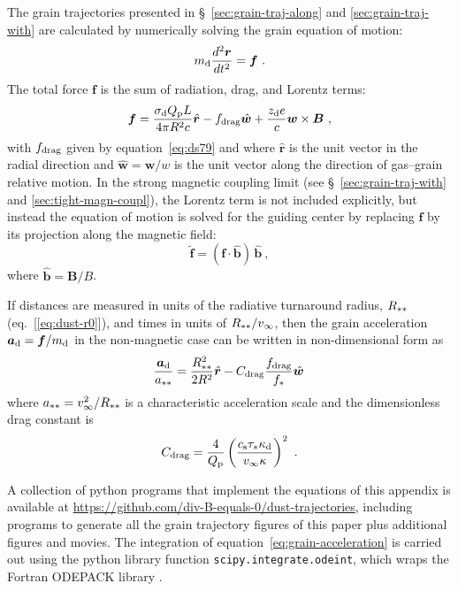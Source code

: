 The grain trajectories presented in \S~\ref{sec:grain-traj-along} and
\ref{sec:grain-traj-with} are calculated by numerically solving the
grain equation of motion:
\begin{equation}
  \label{eq:grain-equation-motion}
  m_{\text{d}} \frac{d^2 \bm{r}}{d t^2} = \bm{f} \ .
\end{equation}
The total force \(\bm{f}\) is the sum of radiation, drag, and Lorentz
terms:
\begin{equation}
  \label{eq:total-force}
  \bm{f} = \frac{\sigma_{\text{d}} Q_{\text{p}} L}{4\pi R^2 c} \hat{\bm{r}}
  - f_{\text{drag}} \hat{\bm{w}}
  + \frac{z_{\text{d}} e}{c} \bm{w} \times \bm{B} \ ,
\end{equation}
with \(f_{\text{drag}}\) given by equation~\eqref{eq:ds79} and where
\(\hat{\bm{r}}\) is the unit vector in the radial direction and
\(\hat{\bm{w}} = \bm{w} / w\) is the unit vector along the direction
of gas--grain relative motion.  In the strong magnetic coupling limit
(see \S~\ref{sec:grain-traj-with} and \ref{sec:tight-magn-coupl}), the
Lorentz term is not included explicitly, but instead the equation of
motion is solved for the guiding center by replacing \(\bm{f}\) by its
projection along the magnetic field: 
\begin{equation}
  \label{eq:projected-force}
  \widetilde{\bm{f}} = (\bm{f} \cdot \hat{\bm{b}})  \, \hat{\bm{b}} \ ,
\end{equation}
where \(\hat{\bm{b}} = \bm{B} / B\).

If distances are measured in units of the radiative turnaround radius,
\(R_{**}\) (eq.~[\ref{eq:dust-r0}]), and times in units of
\(R_{**} / v_\infty\), then the grain acceleration
\(\bm{a}_{\text{d}} = \bm{f} / m_{\text{d}}\) in the non-magnetic case can be
written in non-dimensional form as
\begin{equation}
  \label{eq:grain-acceleration}
  \frac{\bm{a}_{\text{d}}}{a_{**}}
  = \frac{R_{**}^2}{2 R^{2}} \hat{\bm{r}}
  - C_{\text{drag}} \frac{f_{\text{drag}}}{f_*} \hat{\bm{w}} \, 
\end{equation}
where \(a_{**} = v_\infty^2 / R_{**}\) is a characteristic
acceleration scale and the dimensionless drag constant is
\begin{equation}
  \label{eq:drag-constant}
  C_{\text{drag}} = \frac{4}{Q_{\text{p}}} \left(\frac{c_{\text{s}} \tau_* \kappa_{\text{d}}}{v_\infty \kappa}\right)^2 \ .
\end{equation}

A collection of python programs that implement the equations of this
appendix is available at
\url{https://github.com/div-B-equals-0/dust-trajectories}, including
programs to generate all the grain trajectory figures of this paper
plus additional figures and movies.  The integration of
equation~\eqref{eq:grain-acceleration} is carried out using the
python library function \texttt{scipy.integrate.odeint}, which wraps
the Fortran ODEPACK library \citep{Hindmarsh:1983a, Jones:2001a}.


